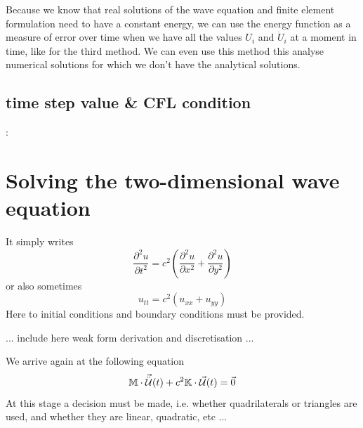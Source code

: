 Because we know that real solutions of the wave equation and finite element formulation need to have a
constant energy, we can use the energy function as a measure of error over time when we have all the values
$U_i$ and $\dot{U}_i$ at a moment in time, like for the third method. We can even use this method this analyse
numerical solutions for which we don’t have the analytical solutions.

\subsection{time step value \& CFL condition}






:




\newpage
\section{Solving the two-dimensional wave equation}




It simply writes
\[
\frac{\partial^2 u}{\partial t^2} = c^2 
\left( 
\frac{\partial^2 u}{\partial x^2} + 
\frac{\partial^2 u}{\partial y^2} 
\right)
\]
or also sometimes
\[
u_{tt} = c^2 (u_{xx} + u_{yy})
\]
Here to initial conditions and boundary conditions must be provided.


{\color{red} ... include here weak form derivation and discretisation ... }

We arrive again at the following equation
\begin{equation}
{\mathbb{M}} \cdot \vec{\ddot{{\cal U}}}(t) + c^2 {\mathbb{K}} \cdot \vec{\cal U}(t) = \vec{0}
\label{ss:waveq2d}
\end{equation}
At this stage a decision must be made, i.e. whether quadrilaterals or triangles 
are used, and whether they are linear, quadratic, etc ...



